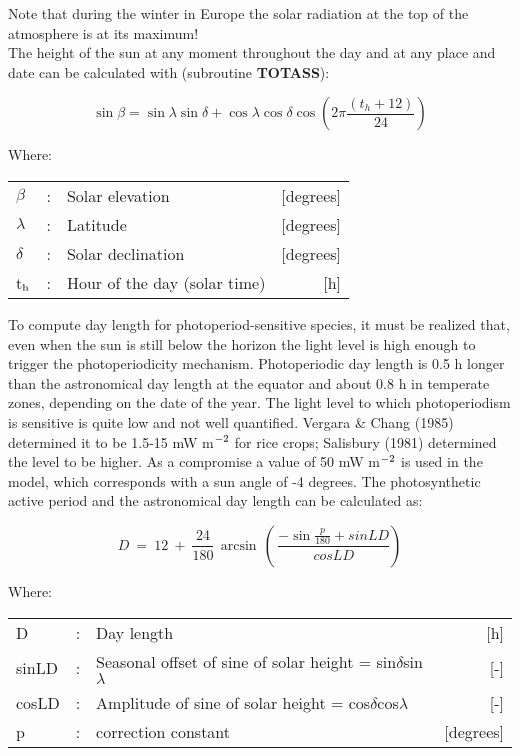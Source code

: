 Note that during the winter in Europe the solar radiation at the top of the atmo\-sphere is at its maximum!\\
The height of the sun at any moment throughout the day and at any place and date can be
calculated with (subroutine {\bf TOTASS}):

\begin{equation}
\sin \beta = \sin \lambda \sin \delta + \cos \lambda \cos \delta \cos (2 \pi {\frac{(t _{h} +12)}{24}} )
\end{equation}

Where:\\
\begin{tabularx}{\textwidth}{llXr}
$\beta$ &:& Solar elevation  & [degrees]\\
$\lambda$ &:& Latitude  & [degrees]\\
$\delta$ &:& Solar declination  & [degrees]\\
t$_{{\rm h}}$ &:& Hour of the day (solar time)  & [h]\\
\end{tabularx}

To compute day length for photoperiod-sensitive species, it must be realized that, even
when the sun is still below the horizon the light level is high enough to trigger the
photoperiodicity mechan\-ism. Photoperiodic day length is 0.5 h longer than the astronomi\-cal day length at the equator and about 0.8 h in temperate zones, depend\-ing on the date of the year. The light level to which photoperiodism is sensitive is quite low and not well
quantified. Vergara \& Chang (1985) determined it to be 1.5-15 mW m$^{{\rm -2}}$ for rice crops; Salisbury (1981) determined the level to be higher. As a compromise a value of 50 mW
m$^{{\rm -2}}$ is used in the model, which corresponds with a sun angle of -4 degrees. The
photosynthetic active period and the astro\-nomical day length can be calculated as:

\begin{equation}
D ~=~ 12~+~{\frac{24}{180}} \, \arcsin \, (\,{\frac{-\sin {\frac{p}{180}} + sinLD}{cosLD}} )
\end{equation}

Where:\\
\begin{tabularx}{\textwidth}{llXr}
D &:& Day length  & [h]\\
sinLD &:& Seasonal offset of sine of solar height = sin$\delta$sin$\lambda$  & [-]\\
cosLD &:& Amplitude of sine of solar height = cos$\delta$cos$\lambda$  & [-]\\
p &:& correction constant  & [degrees]\\
\end{tabularx}

